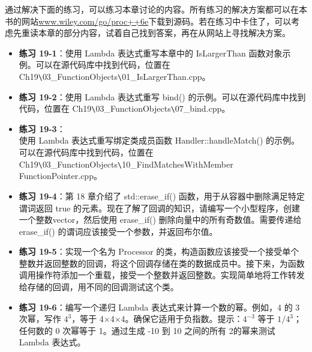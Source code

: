 通过解决下面的练习，可以练习本章讨论的内容。所有练习的解决方案都可以在本书的网站\url{www.wiley.com/go/proc++6e}下载到源码。若在练习中卡住了，可以考虑先重读本章的部分内容，试着自己找到答案，再在从网站上寻找解决方案。

\begin{itemize}
\item
\textbf{练习 19-1}：使用 Lambda 表达式重写本章中的 IsLargerThan 函数对象示例。可以在源代码库中找到代码，位置在 Ch19\verb|\|03\_FunctionObjects\verb|\|01\_IsLargerThan.cpp。

\item
\textbf{练习 19-2}：使用 Lambda 表达式重写 bind() 的示例。可以在源代码库中找到代码，位置在 Ch19\verb|\|03\_FunctionObjects\verb|\|07\_bind.cpp。

\item
\textbf{练习 19-3}：\\使用 Lambda 表达式重写绑定类成员函数 Handler::handleMatch() 的示例。可以在源代码库中找到代码，位置在 Ch19\verb|\|03\_FunctionObjects\verb|\|10\_FindMatchesWithMember\\FunctionPointer.cpp。

\item
\textbf{练习 19-4}：第 18 章介绍了 std::erase\_if() 函数，用于从容器中删除满足特定谓词返回 true 的元素。现在了解了回调的知识，请编写一个小型程序，创建一个整数vector，然后使用 erase\_if() 删除向量中的所有奇数值。需要传递给 erase\_if() 的谓词应该接受一个参数，并返回布尔值。

\item
\textbf{练习 19-5}：实现一个名为 Processor 的类，构造函数应该接受一个接受单个整数并返回整数的回调，将这个回调存储在类的数据成员中。接下来，为函数调用操作符添加一个重载，接受一个整数并返回整数。实现简单地将工作转发给存储的回调，用不同的回调测试这个类。

\item
\textbf{练习 19-6}：编写一个递归 Lambda 表达式来计算一个数的幂。例如，4 的 3 次幂，写作 $4^3$，等于 4×4×4。确保它适用于负指数。提示：$4^{-3}$ 等于 $1/4^3$；任何数的 0 次幂等于 1。通过生成 -10 到 10 之间的所有 2的幂来测试 Lambda 表达式。
\end{itemize}
